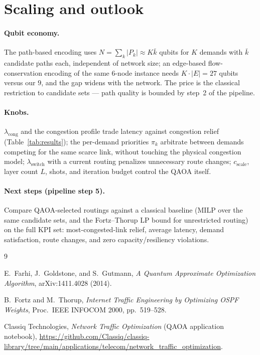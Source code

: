 \documentclass[11pt]{article}
\newcommand{\cng}{\mathrm{cong}}
\newcommand{\switch}{\mathrm{switch}}
\begin{document}
\section{Scaling and outlook}
\label{sec:outlook}

\paragraph{Qubit economy.} The path-based encoding uses
$N = \sum_k |P_k| \approx K \bar{k}$ qubits for $K$ demands with $\bar{k}$
candidate paths each, independent of network size; an edge-based
flow-conservation encoding of the same 6-node instance
\cite{classiqtelecom} needs $K \cdot |E| = 27$ qubits versus our $9$, and the
gap widens with the network. The price is the classical restriction to
candidate sets --- path quality is bounded by step~2 of the pipeline.

\paragraph{Knobs.} $\lambda_{\cng}$ and the congestion profile trade latency
against congestion relief (Table~\ref{tab:results}); the per-demand priorities
$\pi_k$ arbitrate between demands competing for the same scarce link, without
touching the physical congestion model; $\lambda_{\switch}$ with
a current routing penalizes unnecessary route changes;
$c_{\mathrm{scale}}$, layer count $L$, shots, and iteration budget control the
QAOA itself.

\paragraph{Next steps (pipeline step 5).} Compare QAOA-selected routings
against a classical baseline (MILP over the same candidate sets, and the
Fortz--Thorup LP bound for unrestricted routing) on the full KPI set:
most-congested-link relief, average latency, demand satisfaction, route
changes, and zero capacity/resiliency violations.

\begin{thebibliography}{9}

E.~Farhi, J.~Goldstone, and S.~Gutmann,
\emph{A Quantum Approximate Optimization Algorithm},
arXiv:1411.4028 (2014).

B.~Fortz and M.~Thorup,
\emph{Internet Traffic Engineering by Optimizing OSPF Weights},
Proc.\ IEEE INFOCOM 2000, pp.~519--528.

Classiq Technologies,
\emph{Network Traffic Optimization} (QAOA application notebook),
\url{https://github.com/Classiq/classiq-library/tree/main/applications/telecom/network_traffic_optimization}.

\end{thebibliography}
\end{document}
